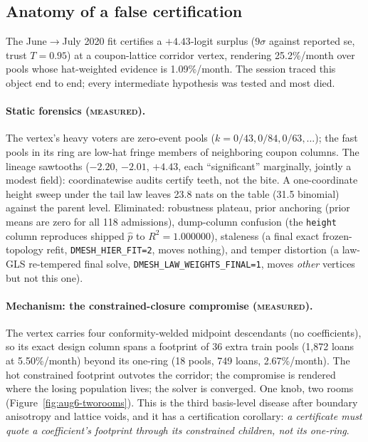 \subsection{Anatomy of a false certification}\label{sec:aug6-anatomy}

The June$\to$July 2020 fit certifies a $+4.43$-logit surplus ($9\sigma$
against reported se, trust $T=0.95$) at a coupon-lattice corridor vertex,
rendering 25.2\%/month over pools whose hat-weighted evidence is
1.09\%/month. The session traced this object end to end; every intermediate
hypothesis was tested and most died.

\paragraph{Static forensics (\textsc{measured}).} The vertex's heavy voters
are zero-event pools ($k=0/43,0/84,0/63,\ldots$); the fast pools in its ring
are low-hat fringe members of neighboring coupon columns. The lineage
sawtooths ($-2.20$, $-2.01$, $+4.43$, each ``significant'' marginally,
jointly a modest field): coordinatewise audits certify teeth, not the bite.
A one-coordinate height sweep under the tail law leaves 23.8 nats on the
table (31.5 binomial) against the parent level. Eliminated: robustness
plateau, prior anchoring (prior means are zero for all 118 admissions),
dump-column confusion (the \texttt{height} column reproduces shipped
$\hat p$ to $R^2=1.000000$), staleness (a final exact frozen-topology refit,
\texttt{DMESH\_HIER\_FIT=2}, moves nothing), and temper distortion (a
law-GLS re-tempered final solve, \texttt{DMESH\_LAW\_WEIGHTS\_FINAL=1},
moves \emph{other} vertices but not this one).

\paragraph{Mechanism: the constrained-closure compromise (\textsc{measured}).}
The vertex carries four conformity-welded midpoint descendants (no
coefficients), so its exact design column spans a footprint of 36 extra train
pools (1{,}872 loans at 5.50\%/month) beyond its one-ring (18 pools, 749
loans, 2.67\%/month). The hot constrained footprint outvotes the corridor;
the compromise is rendered where the losing population lives; the solver is
converged. One knob, two rooms (Figure~\ref{fig:aug6-tworooms}). This is the
third basis-level disease after boundary anisotropy and lattice voids, and it
has a certification corollary: \emph{a certificate must quote a coefficient's
footprint through its constrained children, not its one-ring}.

